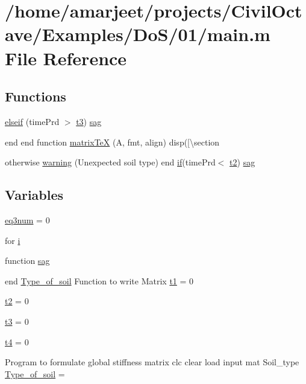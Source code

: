 \hypertarget{a00005}{}\section{/home/amarjeet/projects/\+Civil\+Octave/\+Examples/\+Do\+S/01/main.m File Reference}
\label{a00005}
\subsection*{Functions}
\begin{DoxyCompactItemize}
\item 
\hyperlink{a00005_a0d135864d9bc0103cbd903c62d64b088}{elseif} (time\+Prd $>$ \hyperlink{a00005_a80d62394ff82e3ae283e9113bca340a2}{t3}) \hyperlink{a00005_aac9abc95cd2ddc27fa84fb4440b62888}{sag}
\item 
end end function \hyperlink{a00005_a8c0a4f44ca03289871d3743578e0412c}{matrix\+Te\+X} (A, fmt, align) disp(\mbox{[}\textquotesingle{}\textbackslash{}section
\item 
otherwise \hyperlink{a00005_a29249d852e6e3fd1e206e1f920300e24}{warning} (\textquotesingle{}Unexpected soil type\textquotesingle{}) end \hyperlink{a00029_a87cf461060832b8b68a7b48d9e371e4f}{if}(time\+Prd$<$ \hyperlink{a00005_a24aeadb733f27244ec14e4cba82eeee9}{t2}) \hyperlink{a00005_aac9abc95cd2ddc27fa84fb4440b62888}{sag}
\end{DoxyCompactItemize}
\subsection*{Variables}
\begin{DoxyCompactItemize}
\item 
\hyperlink{a00005_a8ecbd124ddcdab7fc367443a82b241af}{eq3num} = 0
\item 
for \hyperlink{a00005_a6dbbc96f4222af2f6c18c8e60f41726b}{i}
\item 
function \hyperlink{a00005_aac9abc95cd2ddc27fa84fb4440b62888}{sag}
\item 
end \hyperlink{a00005_a3e2c6a7e7b1f0ac68cc462d26373be9b}{Type\+\_\+of\+\_\+soil} Function to write Matrix \hyperlink{a00005_a3a318718cf4c9c1380475d059171d8f3}{t1} = 0
\item 
\hyperlink{a00005_a24aeadb733f27244ec14e4cba82eeee9}{t2} = 0
\item 
\hyperlink{a00005_a80d62394ff82e3ae283e9113bca340a2}{t3} = 0
\item 
\hyperlink{a00005_ae95ab11d59379638967673bd74654b2a}{t4} = 0
\item 
Program to formulate global stiffness matrix clc clear load input mat Soil\+\_\+type \hyperlink{a00005_a3e2c6a7e7b1f0ac68cc462d26373be9b}{Type\+\_\+of\+\_\+soil} = \textquotesingle{}\textquotesingle{}
\end{DoxyCompactItemize}


